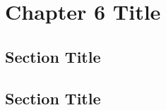 \documentclass[../main.tex]{subfiles}
\begin{document}
\newpage
\onehalfspacing
\RaggedRight
\setcounter{chapter}{5}
\thesischapterstyle

\chapter{Chapter 6 Title}\label{chap6:short-label}

\section{Section Title}
\lipsum[1]

\section{Section Title}
\lipsum[2]
\end{document}
